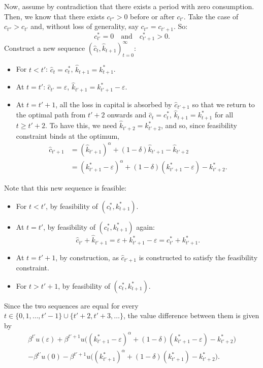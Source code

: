 Now, assume by contradiction that there exists a period with zero consumption. Then, we know that there exists $c_{t''}>0$ before or after $c_{t'}$. Take the case of $c_{t''}>c_{t'}$ and, without loss of generality, say $c_{t''}=c_{t'+1}$. So:
\[
c_{t'}^*=0 \quad\text{and}\quad c_{t'+1}^*>0.
\]
Construct a new sequence $(\hat c_t, \hat k_{t+1})_{t=0}^\infty$:
\begin{itemize}
    \item For $t<t'$: $\hat c_t=c_t^*$, $\hat k_{t+1}=k_{t+1}^*$.
    \item At $t=t'$: $\hat c_{t'}=\varepsilon$, $\hat k_{t'+1}=k_{t'+1}^* -\varepsilon$.
    \item At $t = t' + 1$, all the loss in capital is absorbed by $\hat{c}_{t'+1}$ so that we return to the optimal path from $t' + 2$ onwards and $\hat c_t=c_t^*$, $\hat k_{t+1}=k_{t+1}^*$ for all $t \geq t' + 2$. 
    To have this, we need $\hat k_{t' + 2} = k_{t' + 2}^*$, and so, since feasibility constraint binds at the optimum,
    \begin{align*}
        \hat c_{t'+ 1} &= (\hat k_{t' + 1})^\alpha + (1 - \delta) \hat k_{t' + 1} - \hat k_{t' + 2} \\
        & = (k_{t'+1}^* -\varepsilon)^\alpha + (1- \delta)(k_{t'+1}^* -\varepsilon) - k_{t' + 2}^*.
    \end{align*}
\end{itemize}
Note that this new sequence is feasible:
\begin{itemize}
    \item For $t<t'$, by feasibility of $(c_t^*,k_{t+1}^*)$.
    \item At $t=t'$, by feasibility of $(c_t^*,k_{t+1}^*)$ again:
    \[
    \hat c_{t'}+\hat k_{t'+1}=\varepsilon + k_{t' + 1}^*-\varepsilon = c^*_{t'}+ k^*_{t'+1}.
    \]
    \item At $t=t'+1$, by construction, as $\hat c_{t' + 1}$ is constructed to satisfy the feasibility constraint. 
    \item For $t> t' + 1$, by feasibility of $(c_t^*,k_{t+1}^*)$.

\end{itemize}
Since the two sequences are equal for every $t \in \{0,1,\dots, t'-1\} \cup \{t' + 2,t'+3,\dots\}$, the value difference between them is given by
\begin{align*}
\beta ^{t'} u(\varepsilon) + \beta^{t' + 1}u \big((k_{t'+1}^* -\varepsilon)^\alpha + (1- \delta)(k_{t'+1}^* -\varepsilon) - k_{t' + 2}^*\big) \\ - \beta ^{t'} u(0) - \beta^{t' + 1}u \big((k_{t'+1}^*)^\alpha + (1- \delta)(k_{t'+1}^*) - k_{t' + 2}^*\big).
\end{align*}
